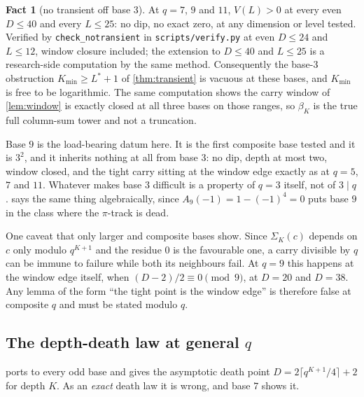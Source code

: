 \documentclass[11pt]{amsart}
\theoremstyle{definition}
\newtheorem{fact}[theorem]{Fact}
\theoremstyle{remark}
\begin{document}
\begin{fact}[no transient off base $3$]
\label{fact:notransient}
At $q = 7$, $9$ and $11$, $V(L) > 0$ at every even $D \le 40$ and every $L \le 25$: no dip, no exact zero, at any dimension or level tested. Verified by \texttt{check\_notransient} in \texttt{scripts/verify.py} at even $D \le 24$ and $L \le 12$, window closure included; the extension to $D \le 40$ and $L \le 25$ is a research-side computation by the same method. Consequently the base-$3$ obstruction $K_{\min} \ge L^{*}+1$ of \cref{thm:transient} is vacuous at these bases, and $K_{\min}$ is free to be logarithmic. The same computation shows the carry window of \cref{lem:window} is exactly closed at all three bases on those ranges, so $\beta_K$ is the true full column-sum tower and not a truncation.
\end{fact}

Base $9$ is the load-bearing datum here. It is the first composite base tested and it is $3^2$, and it inherits nothing at all from base $3$: no dip, depth at most two, window closed, and the tight carry sitting at the window edge exactly as at $q = 5$, $7$ and $11$. Whatever makes base $3$ difficult is a property of $q = 3$ itself, not of $3 \mid q$.  says the same thing algebraically, since $A_9(-1) = 1 - (-1)^4 = 0$ puts base $9$ in the class where the $\pi$-track is dead.

One caveat that only larger and composite bases show. Since $\Sigma_K(c)$ depends on $c$ only modulo $q^{K+1}$ and the residue $0$ is the favourable one, a carry divisible by $q$ can be immune to failure while both its neighbours fail. At $q = 9$ this happens at the window edge itself, when $(D-2)/2 \equiv 0 \pmod 9$, at $D = 20$ and $D = 38$. Any lemma of the form ``the tight point is the window edge'' is therefore false at composite $q$ and must be stated modulo $q$.

\subsection*{The depth-death law at general $q$}

 ports to every odd base and gives the asymptotic death point $D = 2\lceil q^{K+1}/4\rceil + 2$ for depth $K$. As an \emph{exact} death law it is wrong, and base $7$ shows it.
\end{document}
